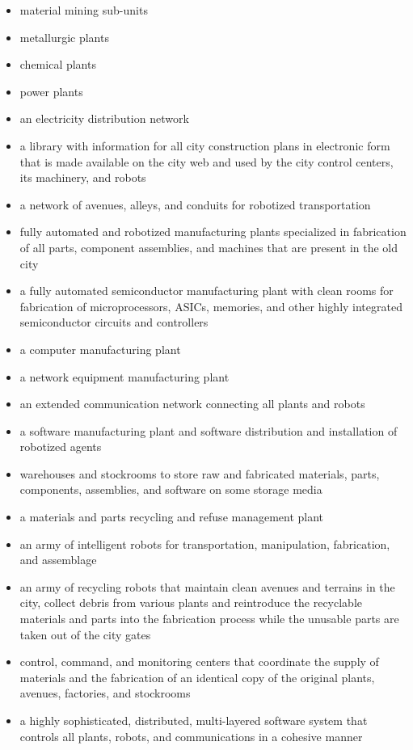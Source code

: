 \begin{itemize}
\item material mining sub-units 
\item metallurgic plants
\item chemical plants
\item power plants
\item an electricity distribution network
\item a library with information for all city construction plans in
electronic form that is made available on the city web and used by the
city control centers, its machinery, and robots
\item a network of avenues, alleys, and conduits for robotized
transportation
\item fully automated and robotized manufacturing plants specialized in
fabrication of all parts, component assemblies, and machines that are
present in the old city
\item a fully automated semiconductor manufacturing plant with clean
rooms for fabrication of microprocessors, ASICs, memories, and other
highly integrated semiconductor circuits and controllers
\item a computer manufacturing plant
\item a network equipment manufacturing plant
\item an extended communication network connecting 
all plants and robots
\item a software manufacturing plant and software distribution and
installation of robotized agents
\item warehouses and stockrooms to store raw and fabricated materials,
parts, components, assemblies, and software on some storage media
\item a materials and parts recycling and refuse management plant
\item an army of intelligent robots for transportation, manipulation,
fabrication, and assemblage
\item an army of recycling robots that maintain clean avenues and
terrains in the city, collect debris from various plants and
reintroduce the recyclable materials and parts into the fabrication process
while the unusable parts are taken out of the city gates
\item control, command, and monitoring centers that coordinate the supply of
materials and the fabrication of an identical copy of
the original plants, avenues, factories, and stockrooms
\item a highly sophisticated, distributed, multi-layered software system
that controls all plants, robots, and communications in a cohesive
manner
\end{itemize}

